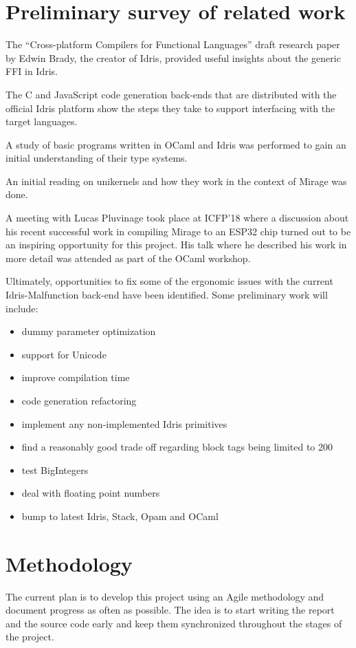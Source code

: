\documentclass[a4paper]{report}
\begin{document}
\section{Preliminary survey of related work}
The ``Cross-platform Compilers for Functional Languages'' draft
research paper by Edwin Brady, the creator of Idris,
provided useful insights about the generic FFI in Idris.

The C and JavaScript code generation back-ends that are distributed
with the official Idris platform show the steps they take to
support interfacing with the target languages.

A study of basic programs written in OCaml and Idris was performed to gain an
initial understanding of their type systems.

An initial reading on unikernels and how they
work in the context of Mirage was done.

A meeting with Lucas Pluvinage took place at ICFP'18 where a discussion
about his recent successful work in compiling Mirage to an ESP32 chip turned
out to be an inspiring opportunity for this project.
His talk where he described his work in more detail was attended as part of the
OCaml workshop.

Ultimately, opportunities to fix some of the ergonomic issues
with the current Idris-Malfunction back-end have been
identified.
Some preliminary work will include:
\begin{itemize}
	\item dummy parameter optimization
	\item support for Unicode
	\item improve compilation time
	\item code generation refactoring
	\item implement any non-implemented Idris primitives
	\item find a reasonably good trade off regarding block
	      tags being limited to 200
	\item test BigIntegers
	\item deal with floating point numbers
	\item bump to latest Idris, Stack, Opam and OCaml
\end{itemize}


\section{Methodology}
The current plan is to develop this project using an Agile
methodology and document progress as often as possible.
The idea is to start writing the report and the source code early and keep
them synchronized throughout the stages of the project.
\end{document}
